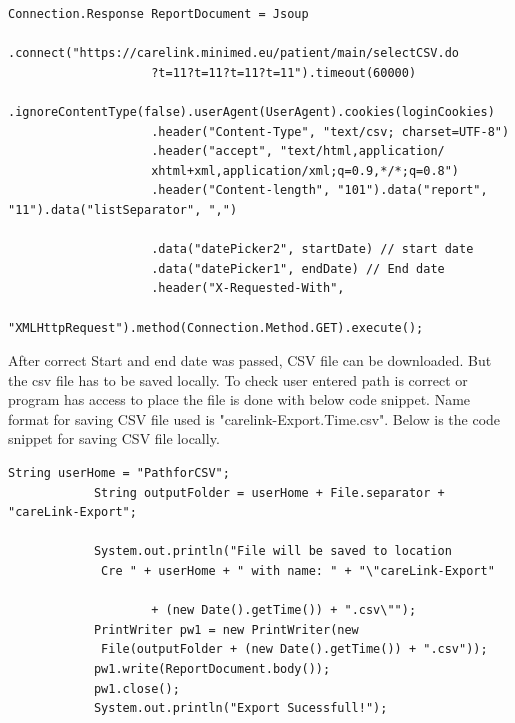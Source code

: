 \documentclass[article,type=msc,colorback,accentcolor=tud9c,twoside,11pt]{tudthesis}
\begin{document}
\begin{lstlisting}
Connection.Response ReportDocument = Jsoup
					.connect("https://carelink.minimed.eu/patient/main/selectCSV.do
					?t=11?t=11?t=11?t=11").timeout(60000)
					.ignoreContentType(false).userAgent(UserAgent).cookies(loginCookies)
					.header("Content-Type", "text/csv; charset=UTF-8")
					.header("accept", "text/html,application/
					xhtml+xml,application/xml;q=0.9,*/*;q=0.8")
					.header("Content-length", "101").data("report", "11").data("listSeparator", ",")
					
					.data("datePicker2", startDate) // start date
					.data("datePicker1", endDate) // End date
					.header("X-Requested-With",
					 "XMLHttpRequest").method(Connection.Method.GET).execute();
\end{lstlisting}
After correct Start and end date was passed, CSV file can be downloaded. But the csv file has to be saved locally. To check user entered path is correct or program has access to place the file is done with below code snippet. Name format for saving CSV file used is "carelink-Export.Time.csv". Below is the code snippet for saving CSV file locally.
\begin{lstlisting}
String userHome = "PathforCSV";
			String outputFolder = userHome + File.separator + "careLink-Export";
			
			System.out.println("File will be saved to location
			 Cre " + userHome + " with name: " + "\"careLink-Export"
			
					+ (new Date().getTime()) + ".csv\"");
			PrintWriter pw1 = new PrintWriter(new
			 File(outputFolder + (new Date().getTime()) + ".csv"));
			pw1.write(ReportDocument.body());
			pw1.close();
			System.out.println("Export Sucessfull!");
\end{lstlisting}
\end{document}
